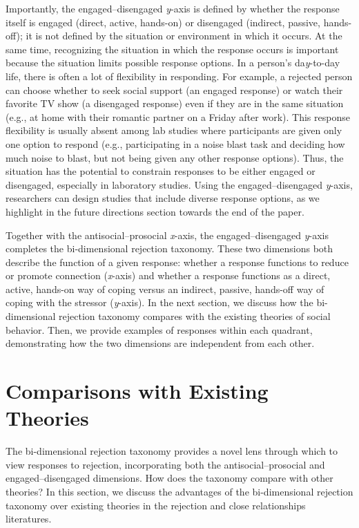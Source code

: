\documentclass[
]{udthesis}
\begin{document}
Importantly, the engaged--disengaged \emph{y}-axis is defined by whether the
response itself is engaged (direct, active, hands-on) or disengaged
(indirect, passive, hands-off); it is not defined by the situation or
environment in which it occurs. At the same time, recognizing the
situation in which the response occurs is important because the
situation limits possible response options. In a person's da\emph{y}-to-day
life, there is often a lot of flexibility in responding. For example, a
rejected person can choose whether to seek social support (an engaged
response) or watch their favorite TV show (a disengaged response) even
if they are in the same situation (e.g., at home with their romantic
partner on a Friday after work). This response flexibility is usually
absent among lab studies where participants are given only one option to
respond (e.g., participating in a noise blast task and deciding how much
noise to blast, but not being given any other response options). Thus,
the situation has the potential to constrain responses to be either
engaged or disengaged, especially in laboratory studies. Using the
engaged--disengaged \emph{y}-axis, researchers can design studies that
include diverse response options, as we highlight in the future
directions section towards the end of the paper.

Together with the antisocial--prosocial \emph{x}-axis, the
engaged--disengaged \emph{y}-axis completes the bi-dimensional rejection
taxonomy. These two dimensions both describe the function of a given
response: whether a response functions to reduce or promote connection
(\emph{x}-axis) and whether a response functions as a direct, active,
hands-on way of coping versus an indirect, passive, hands-off way of
coping with the stressor (\emph{y}-axis). In the next section, we discuss how
the bi-dimensional rejection taxonomy compares with the existing
theories of social behavior. Then, we provide examples of responses
within each quadrant, demonstrating how the two dimensions are
independent from each other.

\section{Comparisons with Existing Theories}\label{comparisons-with-existing-theories}

The bi-dimensional rejection taxonomy provides a novel lens through
which to view responses to rejection, incorporating both the
antisocial--prosocial and engaged--disengaged dimensions. How does the
taxonomy compare with other theories? In this section, we discuss the
advantages of the bi-dimensional rejection taxonomy over existing
theories in the rejection and close relationships literatures.
\end{document}
